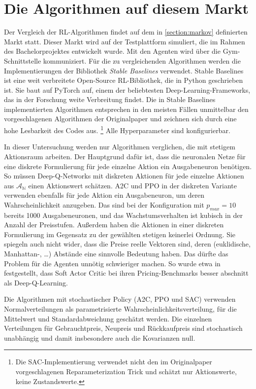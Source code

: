 \section{Die Algorithmen auf diesem Markt}
Der Vergleich der RL-Algorithmen findet auf dem in \ref{section:markov} definierten Markt statt.
Dieser Markt wird auf der Testplattform simuliert, die im Rahmen des Bachelorprojektes entwickelt wurde.
Mit den Agenten wird über die Gym-Schnittstelle \cite{brockman2016openai} kommuniziert.
Für die zu vergleichenden Algorithmen werden die Implementierungen der Bibliothek \textit{Stable Baselines} \cite{stable-baselines} verwendet.
Stable Baselines ist eine weit verbreitete Open-Source RL-Bibliothek, die in Python geschrieben ist.
Sie baut auf PyTorch \cite{NEURIPS2019_9015} auf, einem der beliebtesten Deep-Learning-Frameworks, das in der Forschung weite Verbreitung findet.
Die in Stable Baselines implementierten Algorithmen entsprechen in den meisten Fällen unmittelbar den vorgeschlagenen Algorithmen der Originalpaper und zeichnen sich durch eine hohe Lesbarkeit des Codes aus. \footnote{Die SAC-Implementierung verwendet nicht den im Originalpaper vorgeschlagenen Reparameterization Trick und schätzt nur Aktionswerte, keine Zustandswerte.}
Alle Hyperparameter sind konfigurierbar.

In dieser Untersuchung werden nur Algorithmen verglichen, die mit stetigem Aktionsraum arbeiten.
Der Hauptgrund dafür ist, dass die neuronalen Netze für eine diskrete Formulierung für jede einzelne Aktion ein Ausgabeneuron benötigen.
So müssen Deep-Q-Networks mit diskreten Aktionen für jede einzelne Aktionen aus $\mathcal{A_\mathbb{N}}$ einen Aktionswert schätzen.
A2C und PPO in der diskreten Variante verwenden ebenfalls für jede Aktion ein Ausgabeneuron, um deren Wahrscheinlichkeit anzugeben.
Das sind bei der Konfiguration mit $p_{max}=10$ bereits 1000 Ausgabeneuronen, und das Wachstumsverhalten ist kubisch in der Anzahl der Preisstufen.
Außerdem haben die Aktionen in einer diskreten Formulierung im Gegensatz zu der gewählten stetigen keinerlei Ordnung.
Sie spiegeln auch nicht wider, dass die Preise reelle Vektoren sind, deren (euklidische, Manhattan-, \dots) Abstände eine sinnvolle Bedeutung haben.
Das dürfte das Problem für die Agenten unnötig schwieriger machen.
So wurde etwa in \cite{Kastius2022} festgestellt, dass Soft Actor Critic bei ihren Pricing-Benchmarks besser abschnitt als Deep-Q-Learning.

Die Algorithmen mit stochastischer Policy (A2C, PPO und SAC) verwenden Normalverteilungen als parametrisierte Wahrscheinlichkeitsverteilung, für die Mittelwert und Standardabweichung geschätzt werden.
Die einzelnen Verteilungen für Gebrauchtpreis, Neupreis und Rückkaufpreis sind stochastisch unabhängig und damit insbesondere auch die Kovarianzen null.

